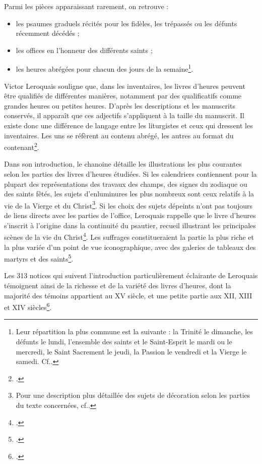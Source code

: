 \documentclass[a4paper,12pt,twoside]{book}
\begin{document}
	
Parmi les pièces apparaissant rarement, on retrouve :
\begin{itemize}
    \item les psaumes graduels récités pour les fidèles, les trépassés ou les défunts récemment décédés ;
    \item les offices en l'honneur des différents saints ;
    \item les heures abrégées pour chacun des jours de la semaine\footnote{Leur répartition la plus commune est la suivante : la Trinité le dimanche, les défunts le lundi, l'ensemble des saints et le Saint-Esprit le mardi ou le mercredi, le Saint Sacrement le jeudi, la Passion le vendredi et la Vierge le samedi. Cf.\cite[p. XXVIII]{Leroquais_notices}.}.
\end{itemize}
	
	Victor Leroquais souligne que, dans les inventaires, les livres d'heures peuvent être qualifiés de différentes manières, notamment par des qualificatifs comme \og{}grandes heures\fg{} ou \og{}petites heures\fg{}. D'après les descriptions et les manuscrits conservés, il apparaît que ces adjectifs s'appliquent à la taille du manuscrit. Il existe donc une différence de langage entre les liturgistes et ceux qui dressent les inventaires. Les uns se réfèrent au contenu abrégé, les autres au format du contenant\footcite[p. XX]{Leroquais_notices}. 
	
	Dans son introduction, le chanoine détaille les illustrations les plus courantes selon les parties des livres d'heures étudiées. Si les calendriers contiennent pour la plupart des représentations des travaux des champs, des signes du zodiaque ou des saints fêtés, les sujets d'enluminures les plus nombreux sont ceux relatifs à la vie de la Vierge et du Christ\footnote {Pour une description plus détaillée des sujets de décoration selon les parties du texte concernées, cf.\cite[p. XLIII-LXXXIV]{Leroquais_notices}.}. Si les choix des sujets dépeints n'ont pas toujours de liens directs avec les parties de l'office, Leroquais rappelle que le livre d'heures s'inscrit à l'origine dans la continuité du psautier, recueil illustrant les principales scènes de la vie du Christ\footcite[p. XLIV]{Leroquais_notices}. Les suffrages constitueraient la partie la plus riche et la plus variée d'un point de vue iconographique, avec des galeries de tableaux des martyrs et des saints\footcite[p. XLVIII]{Leroquais_notices}.
	
	Les 313 notices qui suivent l'introduction particulièrement éclairante de Leroquais témoignent ainsi de la richesse et de la variété des livres d'heures, dont la majorité des témoins appartient au \textsc{XV} siècle, et une petite partie aux \textsc{XII}, \textsc{XIII} et \textsc{XIV} siècles\footcite[p. LXXXIV]{Leroquais_notices}. \\
	
\end{document}
